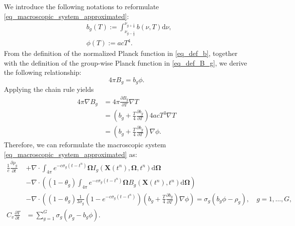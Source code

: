 \documentclass[preprint,12pt]{elsarticle}
\theoremstyle{definition}
\theoremstyle{plain}
\numberwithin{equation}{section}
\numberwithin{algorithm}{section}
\newcounter{eq_count}
\newcounter{subeq_count}
\newcommand{\half}{\frac{1}{2}}
\newcommand{\vOmega}{\mathbf{\Omega}}
\newcommand{\mfx}{{\mathbf{X}}}
\newcommand{\dd}{{\text{d}}}
\newcommand{\pdrv}[2]{\frac{\partial{#1}}{\partial{#2}}}
\begin{document}
We introduce the following notations to reformulate \eqref{eq_macroscopic_system_approximated}:
    \begin{subequations}
          \begin{align}
              &b_g(T) := \int_{\nu_{g-\half}}^{\nu_{g+\half}} b(\nu,T) \dd{\nu},
              \\
              &\phi(T)  := acT^4.
          \end{align}
    \end{subequations}
From the definition of the normalized Planck function in \eqref{eq_def_b}, together with the definition of the group-wise Planck function in \eqref{eq_def_B_g}, we derive the following relationship:
\begin{equation} \label{eq_def_phig}
        4 \pi B_g = b_g \phi.
\end{equation}
Applying the chain rule yields
\begin{equation}\label{eq_def_dBdT}
    \begin{aligned}
            4 \pi \nabla B_g 
            &=4 \pi \pdrv{B_g}{T} \nabla T 
            \\
            &=(b_g + \frac{T}{4} \pdrv{b_g}{T})4acT^3 \nabla T 
            \\
            &=(b_g + \frac{T}{4} \pdrv{b_g}{T}) \nabla \phi.
    \end{aligned}
\end{equation}
Therefore, we can reformulate the macroscopic system \eqref{eq_macroscopic_system_approximated} as:
    \begin{subequations}
    \label{eq_macroscopic_system_approximated_expressed}
		\begin{align}
			\frac{1}{c} \frac{\partial \rho_g}{\partial t}&+\nabla \cdot\int_{4 \pi}  e^{- c  \sigma_g (t - t^n)} \vOmega   I_{g} ( \mfx(t^n), \vOmega,t^n ) \dd{\vOmega} 
            \\ \nonumber
            & - \nabla \cdot \left ( ( 1 - \theta_g  ) \int_{4 \pi}  e^{- c  \sigma_g (t - t^n)} \vOmega  B_g \left( \mfx(t^n),t^n \right) \dd{\vOmega} \right )
            \\ \nonumber \label{eq_energyBalance}
		  & - \nabla \cdot \left ( ( 1 - \theta_g  ) \frac{1 }{3\sigma_{g}}\left(1-e^{-c \sigma_{g}\left(t-t^n\right)}\right) (b_g + \frac{T}{4} \pdrv{b_g}{T}) \nabla \phi \right ) =  \sigma_{g} ( b_g  \phi - \rho_g ),  \quad g=1,\ldots,G, 
            \\  
		  C_v \pdrv{T}{t}&=\sum_{g=1}^{G} \sigma_{g} \left( \rho_g- b_g  \phi \right) .
		\end{align}
    \end{subequations} 
\end{document}
